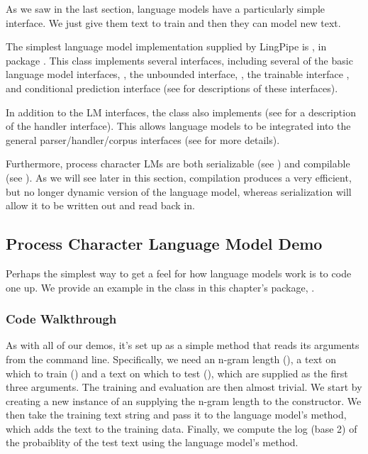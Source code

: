 As we saw in the last section, language models have a particularly
simple interface.  We just give them text to train and then they
can model new text. 

The simplest language model implementation supplied by LingPipe is
, in package .  This class
implements several interfaces, including several of the basic language
model interfaces, , the unbounded interface,
, the trainable interface
, and conditional prediction interface
 (see  for
descriptions of these interfaces).

In addition to the LM interfaces, the  class also
implements  (see
 for a description of the handler interface).
This allows language models to be integrated into the general
parser/handler/corpus interfaces (see  for more
details).

Furthermore, process character LMs are both serializable (see
) and compilable (see
).  As we will see later in this section,
compilation produces a very efficient, but no longer dynamic
version of the language model, whereas serialization will allow
it to be written out and read back in.


\subsection{Process Character Language Model Demo}\label{section:char-lm-process-demo}

Perhaps the simplest way to get a feel for how language models work is
to code one up.  We provide an example in the class
 in this chapter's package,
.  

\subsubsection{Code Walkthrough}

As with all of our demos, it's set up as a simple  method
that reads its arguments from the command line.  Specifically, we need
an n-gram length (), a text on which to train
() and a text on which to test (),
which are supplied as the first three arguments.  The training and
evaluation are then almost trivial.
%
%
We start by creating a new instance of an 
supplying the n-gram length to the constructor.  We then take the
training text string and pass it to the language model's
 method, which adds the text to the
training data.  Finally, we compute the log (base 2) of the
probaiblity of the test text using the language model's
 method.  

